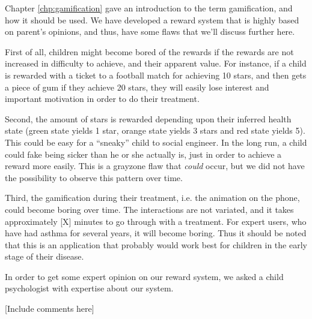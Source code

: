 Chapter \ref{chp:gamification} gave an introduction to the term gamification, and how it should be used. We have developed a reward system that is highly based on parent's opinions, and thus, have some flaws that we'll discuss further here.

First of all, children might become bored of the rewards if the rewards are not increased in difficulty to achieve, and their apparent value. For instance, if a child is rewarded with a ticket to a football match for achieving 10 stars, and then gets a piece of gum if they achieve 20 stars, they will easily lose interest and important motivation in order to do their treatment. 

Second, the amount of stars is rewarded depending upon their inferred health state (green state yields 1 star, orange state yields 3 stars and red state yields 5). This could be easy for a ``sneaky'' child to social engineer. In the long run, a child could fake being sicker than he or she actually is, just in order to achieve a reward more easily. This is a grayzone flaw that \emph{could} occur, but we did not have the possibility to observe this pattern over time.

Third, the gamification during their treatment, i.e. the animation on the phone, could become boring over time. 
The interactions are not variated, and it takes approximately [X] minutes to go through with a treatment. For expert users, who have had asthma for several years, it will become boring. Thus it should be noted that this is an application that probably would work best for children in the early stage of their disease.      

In order to get some expert opinion on our reward system, we asked a child psychologist with expertise about our system. 

[Include comments here] 


